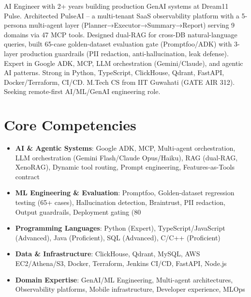 \documentclass[11pt,a4paper,sans]{moderncv}
\begin{document}
\makecvtitle


\vspace{6pt}
\small{AI Engineer with 2+ years building production GenAI systems at Dream11 Pulse. Architected PulseAI -- a multi-tenant SaaS observability platform with a 5-persona multi-agent layer (Planner→Executor→Summary→Report) serving 9 domains via 47 MCP tools. Designed dual-RAG for cross-DB natural-language queries, built 65-case golden-dataset evaluation gate (Promptfoo/ADK) with 3-layer production guardrails (PII redaction, anti-hallucination, leak defense). Expert in Google ADK, MCP, LLM orchestration (Gemini/Claude), and agentic AI patterns. Strong in Python, TypeScript, ClickHouse, Qdrant, FastAPI, Docker/Terraform, CI/CD. M.Tech CS from IIT Guwahati (GATE AIR 312). Seeking remote-first AI/ML/GenAI engineering role.}


\section{Core Competencies}
\vspace{1pt}
\begin{itemize}

\item \textbf{AI \& Agentic Systems}: Google ADK, MCP, Multi-agent orchestration, LLM orchestration (Gemini Flash/Claude Opus/Haiku), RAG (dual-RAG, XenoRAG), Dynamic tool routing, Prompt engineering, Features-as-Tools contract

\item \textbf{ML Engineering \& Evaluation}: Promptfoo, Golden-dataset regression testing (65+ cases), Hallucination detection, Braintrust, PII redaction, Output guardrails, Deployment gating (80%

\item \textbf{Programming Languages}: Python (Expert), TypeScript/JavaScript (Advanced), Java (Proficient), SQL (Advanced), C/C++ (Proficient)

\item \textbf{Data \& Infrastructure}: ClickHouse, Qdrant, MySQL, AWS EC2/Athena/S3, Docker, Terraform, Jenkins CI/CD, FastAPI, Node.js

\item \textbf{Domain Expertise}: GenAI/ML Engineering, Multi-agent architectures, Observability platforms, Mobile infrastructure, Developer experience, MLOps

\end{itemize}
\end{document}
